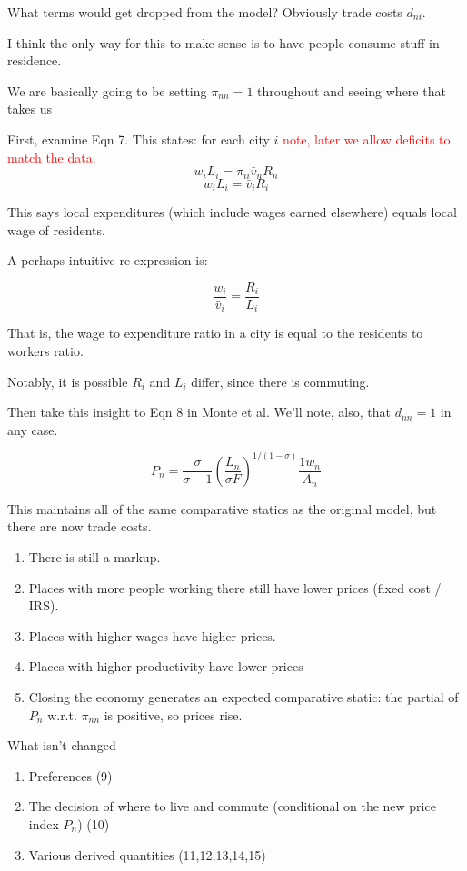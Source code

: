 \documentclass{article}
\begin{document}
What terms would get dropped from the model? Obviously trade costs $d_{ni}$. 

I think the only way for this to make sense is to have people consume stuff in residence. 

We are basically going to be setting $\pi_{nn} = 1$ throughout and seeing where that takes us


First, examine Eqn 7.
This states:  for each city $i$ \textcolor{red}{note, later we allow deficits to match the data.}
$$w_i L_i = \pi_{ii} \bar {v}_n R_n $$
$$w_i L_i = \bar {v}_i R_i $$


This says local expenditures (which include wages earned elsewhere) equals local wage of residents. 

A perhaps intuitive re-expression is:

$$\frac{w_i}{\bar{v}_i} = \frac{R_i}{L_i}$$

That is, the wage to expenditure ratio in a city is equal to the residents to workers ratio.

Notably, it is possible $R_i$ and $L_i$ differ, since there is commuting. 

Then take this insight to Eqn 8 in Monte et al.
We'll note, also, that $d_{nn}=1$ in any case.

$$P_n = \frac{\sigma}{\sigma-1} ( \frac{L_n}{\sigma F})^{1/(1-\sigma)} \frac{1 w_n}{A_n}$$

This maintains all of the same comparative statics as the original model, but there are now trade costs. 
\begin{enumerate}
    \item There is still a markup.
    \item Places with more people working there still have lower prices (fixed cost / IRS).
    \item Places with higher wages have higher prices.
    \item Places with higher productivity have lower prices
    \item Closing the economy generates an expected comparative static: the partial of $P_n$ w.r.t. $\pi_{nn}$ is positive, so prices rise.
\end{enumerate}


What isn't changed
\begin{enumerate}
\item Preferences (9)
\item The decision of where to live and commute  (conditional on the new price index $P_n$) (10)
\item Various derived quantities (11,12,13,14,15)
\end{enumerate}
\end{document}
